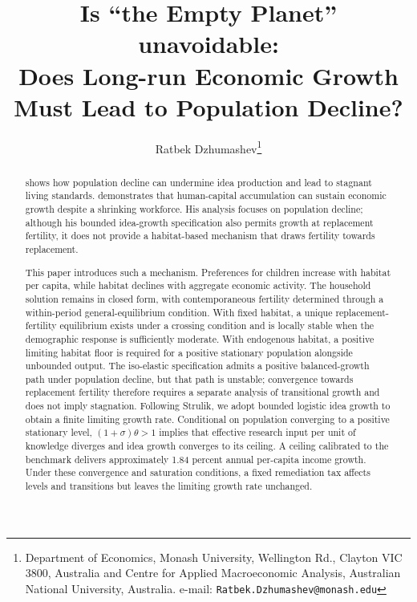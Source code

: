 \documentclass[11pt]{article}
\title{Is ``the Empty Planet''  unavoidable: \\
Does Long-run Economic Growth Must Lead to Population Decline?}%
\author{Ratbek Dzhumashev\thanks{Department of Economics, Monash University, Wellington Rd., Clayton VIC 3800, Australia and Centre for Applied Macroeconomic Analysis, Australian National University, Australia.           e-mail: \texttt{Ratbek.Dzhumashev@monash.edu}} 	
}
\date{}
\begin{document}
\maketitle
\begin{abstract}
\noindent
\citet{jones22} shows how population decline can undermine idea production and lead to stagnant living standards. \citet{STRULIK2024104943} demonstrates that human-capital accumulation can sustain economic growth despite a shrinking workforce. His analysis focuses on population decline; although his bounded idea-growth specification also permits growth at replacement fertility, it does not provide a habitat-based mechanism that draws fertility towards replacement.

This paper introduces such a mechanism. Preferences for children increase with habitat per capita, while habitat declines with aggregate economic activity. The household solution remains in closed form, with contemporaneous fertility determined through a within-period general-equilibrium condition. With fixed habitat, a unique replacement-fertility equilibrium exists under a crossing condition and is locally stable when the demographic response is sufficiently moderate. With endogenous habitat, a positive limiting habitat floor is required for a positive stationary population alongside unbounded output. The iso-elastic specification admits a positive balanced-growth path under population decline, but that path is unstable; convergence towards replacement fertility therefore requires a separate analysis of transitional growth and does not imply stagnation. Following Strulik, we adopt bounded logistic idea growth to obtain a finite limiting growth rate. Conditional on population converging to a positive stationary level, $(1+\sigma)\theta>1$ implies that effective research input per unit of knowledge diverges and idea growth converges to its ceiling. A ceiling calibrated to the benchmark delivers approximately 1.84 percent annual per-capita income growth. Under these convergence and saturation conditions, a fixed remediation tax affects levels and transitions but leaves the limiting growth rate unchanged.

\end{abstract}
\end{document}
